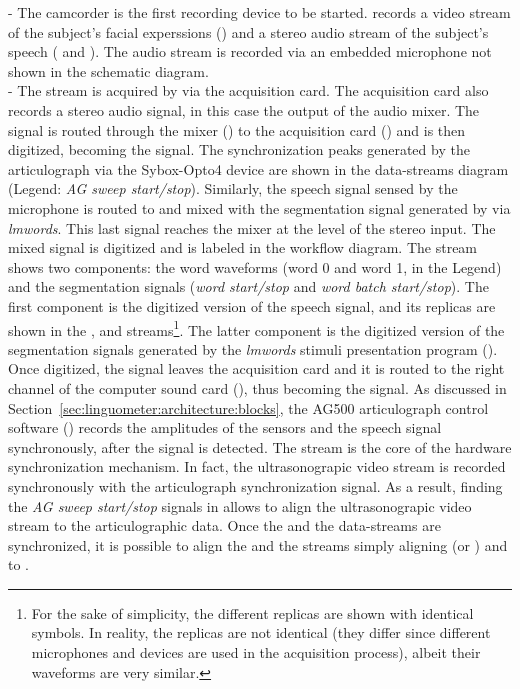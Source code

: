  - The  camcorder is the first recording device to be
started. 
 records a video stream of the subject's facial experssions
() and a stereo audio stream of the subject's speech 
( and ).
The audio stream is recorded via an embedded microphone not shown in the
schematic diagram.\\

 - The  stream is acquired by  via the
 acquisition
card.
The acquisition card also records a stereo audio signal, in this case the
output of the  audio mixer.
The  signal is routed through the mixer () to the 
acquisition card () and is then digitized, becoming the 
signal.
The synchronization peaks generated by the articulograph via the Sybox-Opto4
device are shown in the data-streams diagram
(Legend: \emph{AG sweep start/stop}).
Similarly, the speech signal  sensed by the  microphone is
routed to  and mixed with the segmentation signal generated 
by  via \emph{lmwords}.
This last signal reaches the  mixer at the level of the 
stereo input.
The mixed signal is digitized and is labeled  in the workflow
diagram.
The  stream shows two components: the word waveforms (word 0 and
word 1, in the Legend) and the segmentation signals (\emph{word start/stop} and 
\emph{word batch start/stop}).
The first component is the digitized version of the  speech signal,
and its replicas are shown in the ,  and 
streams\footnote{For the sake of simplicity, the different replicas are shown
with identical symbols. In reality, the replicas are not identical 
(they differ since different microphones and devices are used in the 
acquisition process), albeit their waveforms are very similar.}.
The latter component is the digitized version of the segmentation signals
generated by the \emph{lmwords} stimuli presentation program
().
Once digitized, the  signal leaves the  acquisition
card and it is routed to the right channel of the  computer sound card
(), thus becoming the  signal.
As discussed in Section~\ref{sec:linguometer:architecture:blocks}, the AG500
articulograph control software () records the amplitudes of the
sensors and the speech signal synchronously, after the  signal is
detected.
The  stream is the core of the hardware synchronization mechanism. 
In fact, the ultrasonograpic video stream is recorded synchronously with the
articulograph synchronization signal.
As a result, finding the \emph{AG sweep start/stop} signals in  
allows to align the ultrasonograpic video stream to the articulographic 
data.
Once the  and the  data-streams are synchronized, it is possible
to align the  and the  streams simply aligning
 (or ) and  to
.\\


